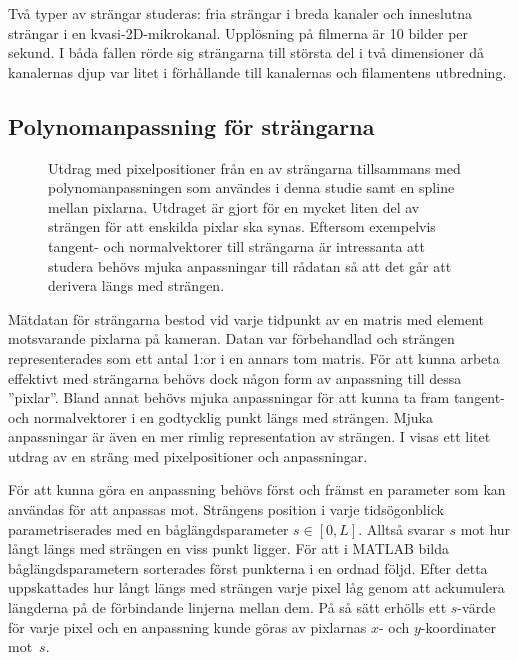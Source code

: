 Två typer av strängar studeras: fria strängar i breda kanaler och inneslutna strängar i en kvasi-2D-mikrokanal. Upplösning på filmerna är 10 bilder per sekund. I båda fallen rörde sig strängarna till största del i två dimensioner då kanalernas djup var litet i förhållande till kanalernas och filamentens utbredning.


\subsection{Polynomanpassning för strängarna} \label{sec:polynomanpassning}

\begin{figure}\centering

\caption{
Utdrag med pixelpositioner från en av strängarna tillsammans med polynomanpassningen som användes i denna studie samt en spline mellan pixlarna. Utdraget är gjort för en mycket liten del av strängen för att enskilda pixlar ska synas.
Eftersom exempelvis tangent- och normalvektorer till strängarna är intressanta att studera behövs mjuka anpassningar till rådatan så att det går att derivera längs med strängen. 
}
\label{fig:strang_anpassning}
\end{figure}

Mätdatan för strängarna bestod vid varje tidpunkt av en matris med element motsvarande pixlarna på kameran. Datan var förbehandlad och strängen representerades som ett antal 1:or i en annars tom matris. 
För att kunna arbeta effektivt med strängarna behövs dock någon form av anpassning till dessa ''pixlar''. Bland annat behövs mjuka anpassningar för att kunna ta fram tangent- och normalvektorer i en godtycklig punkt längs med strängen. Mjuka anpassningar är även en mer rimlig representation av strängen. I  visas ett litet utdrag av en sträng med pixelpositioner och anpassningar. 

För att kunna göra en anpassning behövs först och främst en parameter som kan användas för att anpassas mot. 
Strängens position i varje tidsögonblick parametriserades med en båglängdsparameter $s\in[0,L]$. Alltså svarar $s$ mot hur långt längs med strängen en viss punkt ligger. 
För att i MATLAB bilda båglängdsparametern sorterades först punkterna i en ordnad följd. Efter detta uppskattades hur långt längs med strängen varje pixel låg genom att ackumulera längderna på de förbindande linjerna mellan dem. På så sätt erhölls ett $s$-värde för varje pixel och en anpassning kunde göras av pixlarnas $x$- och $y$-koordinater mot~$s$.


